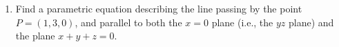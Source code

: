 \documentclass{article}
\begin{document}
\begin{enumerate}
\item 

Find a parametric equation describing the line passing by the point $P = (1, 3, 0)$, and parallel to both the $x=0$ plane (i.e., the $yz$ plane) and the plane $x + y + z = 0$. 

\end{enumerate}
\end{document}
